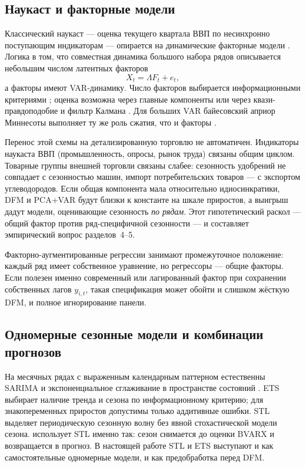 \documentclass[12pt]{article}
\begin{document}
\subsection{Наукаст и факторные модели}

Классический наукаст --- оценка текущего квартала ВВП по несинхронно поступающим индикаторам --- опирается на динамические факторные модели \citep{giannone2008,banbura2013,bok2017}. Логика в том, что совместная динамика большого набора рядов описывается небольшим числом латентных факторов
\begin{equation}
X_t = \Lambda F_t + e_t,
\end{equation}
а факторы имеют VAR-динамику. Число факторов выбирается информационными критериями \citet{baing2002}; оценка возможна через главные компоненты \citep{stock2002,stock2002fa} или через квази-правдоподобие и фильтр Калмана \citep{doz2012,forni2005}. Для больших VAR байесовский априор Миннесоты выполняет ту же роль сжатия, что и факторы \citep{doan1984,litterman1986,banbura2010}.

Перенос этой схемы на детализированную торговлю не автоматичен. Индикаторы наукаста ВВП (промышленность, опросы, рынок труда) связаны общим циклом. Товарные группы внешней торговли связаны слабее: сезонность удобрений не совпадает с сезонностью машин, импорт потребительских товаров --- с экспортом углеводородов. Если общая компонента мала относительно идиосинкратики, DFM и PCA+VAR будут близки к константе на шкале приростов, а выигрыш дадут модели, оценивающие сезонность \emph{по рядам}. Этот гипотетический раскол --- общий фактор против ряд-специфичной сезонности --- и составляет эмпирический вопрос разделов~4--5.

Факторно-аугментированные регрессии \citep{stock2002fa,bernanke2005} занимают промежуточное положение: каждый ряд имеет собственное уравнение, но регрессоры --- общие факторы. Если полезен именно современный или лагированный фактор при сохранении собственных лагов $y_{i,t}$, такая спецификация может обойти и слишком жёсткую DFM, и полное игнорирование панели.

\subsection{Одномерные сезонные модели и комбинации прогнозов}

На месячных рядах с выраженным календарным паттерном естественны SARIMA \citep{box2015} и экспоненциальное сглаживание в пространстве состояний \citep{hyndman2002,hyndman2008,hyndman2021}. ETS выбирает наличие тренда и сезона по информационному критерию; для знакопеременных приростов допустимы только аддитивные ошибки. STL \citep{cleveland1990} выделяет периодическую сезонную волну без явной стохастической модели сезона. \citet{slabolitskiy2026} использует STL именно так: сезон снимается до оценки BVARX и возвращается в прогноз. В настоящей работе STL и ETS выступают и как самостоятельные одномерные модели, и как предобработка перед DFM.
\end{document}
